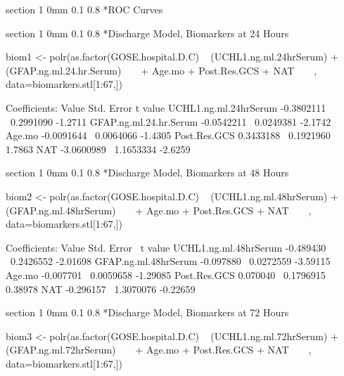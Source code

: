 \documentclass[12pt]{article}
\makeatletter
\newcommand{\9}{\\[9pt]}
\renewcommand{\section}{\@startsection
	    {section}%
	    {1}%
	    {0mm}%
	    {0.1\baselineskip}%
	    {0.8\baselineskip}%
	    {\newpage \color[cmyk]{0.43,0,0.01,0} \center\LARGE}}%
\makeatother
\begin{document}
\begin{landscape}
\begin{Large}
{\section*{ROC Curves}
\vspace{-2.0in}
\begin{center}
\parbox{\linewidth}{  \begin{center} 
    \end{center} }
\end{center}

\section*{Discharge Model, Biomarkers at 24 Hours}
\begin{VM}
biom1 <- polr(as.factor(GOSE.hospital.D.C) ~ (UCHL1.ng.ml.24hrSerum) 
                                           + (GFAP.ng.ml.24.hr.Serum)
    + Age.mo + Post.Res.GCS + NAT
    , data=biomarkers.stl[1:67,])

Coefficients:
                            Value Std. Error t value
UCHL1.ng.ml.24hrSerum  -0.3802111  0.2991090 -1.2711
GFAP.ng.ml.24.hr.Serum -0.0542211  0.0249381 -2.1742
Age.mo                 -0.0091644  0.0064066 -1.4305
Post.Res.GCS            0.3433188  0.1921960  1.7863
NAT                    -3.0600989  1.1653334 -2.6259
\end{VM}

\section*{Discharge Model, Biomarkers at 48 Hours}
\begin{VM}
biom2 <- polr(as.factor(GOSE.hospital.D.C) ~ (UCHL1.ng.ml.48hrSerum) 
                                           + (GFAP.ng.ml.48hrSerum)
    + Age.mo + Post.Res.GCS + NAT
    , data=biomarkers.stl[1:67,])

Coefficients:
                          Value Std. Error  t value
UCHL1.ng.ml.48hrSerum -0.489430  0.2426552 -2.01698
GFAP.ng.ml.48hrSerum  -0.097880  0.0272559 -3.59115
Age.mo                -0.007701  0.0059658 -1.29085
Post.Res.GCS           0.070040  0.1796915  0.38978
NAT                   -0.296157  1.3070076 -0.22659
\end{VM}

\section*{Discharge Model, Biomarkers at 72 Hours}
\begin{VM}
biom3 <- polr(as.factor(GOSE.hospital.D.C) ~ (UCHL1.ng.ml.72hrSerum) 
                                           + (GFAP.ng.ml.72hrSerum)
    + Age.mo + Post.Res.GCS + NAT
    , data=biomarkers.stl[1:67,])


\end{VM}}
\end{Large}
\end{landscape}
\end{document}
